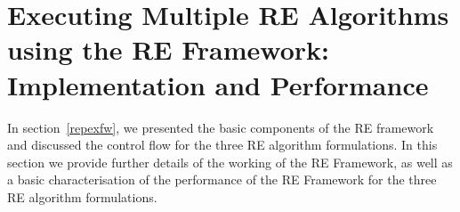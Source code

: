 \documentclass{rspublic}
\newcommand{\jhanote}[1]{ {\textcolor{red} { ***shantenu: #1 }}}
\newcommand{\alnote}[1]{ {\textcolor{blue} { ***andre: #1 }}}
\newcommand{\athotanote}[1]{ {\textcolor{green} { ***athota: #1 }}}
\newcommand{\alnote}[1]{}
\newcommand{\athotanote}[1]{}
\newcommand{\jhanote}[1]{}
\begin{document}


\section{Executing Multiple RE Algorithms using the RE Framework: Implementation and Performance}
\label{sec:re_impl}

In section~\ref{repexfw}, we presented the basic components of the RE
framework and discussed the control flow for the three RE algorithm
formulations.  In this section we provide further details of the
working of the RE Framework, as well as a basic characterisation of
the performance of the RE Framework for the three RE algorithm
formulations.  






\end{document}

